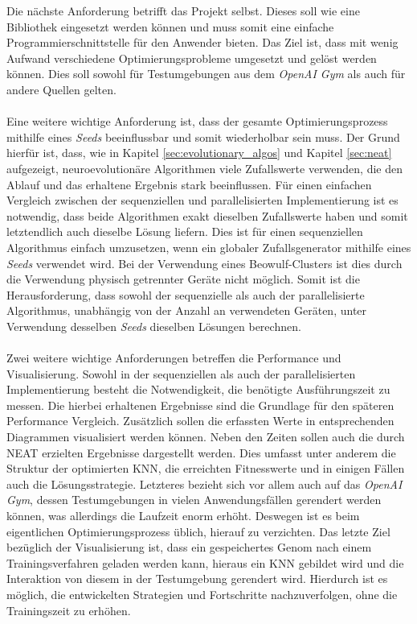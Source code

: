 Die nächste Anforderung betrifft das Projekt selbst. Dieses soll wie eine Bibliothek eingesetzt werden können und muss somit eine einfache Programmierschnittstelle für den Anwender bieten. Das Ziel ist, dass mit wenig Aufwand verschiedene Optimierungsprobleme umgesetzt und gelöst werden können. Dies soll sowohl für Testumgebungen aus dem \emph{OpenAI Gym} als auch für andere Quellen gelten. 
\\\\ %
Eine weitere wichtige Anforderung ist, dass der gesamte Optimierungsprozess mithilfe eines \emph{Seeds} beeinflussbar und somit wiederholbar sein muss. Der Grund hierfür ist, dass, wie in Kapitel \ref{sec:evolutionary_algos} und Kapitel \ref{sec:neat} aufgezeigt, neuroevolutionäre Algorithmen viele Zufallswerte verwenden, die den Ablauf und das erhaltene Ergebnis stark beeinflussen. Für einen einfachen Vergleich zwischen der sequenziellen und parallelisierten Implementierung ist es notwendig, dass beide Algorithmen exakt dieselben Zufallswerte haben und somit letztendlich auch dieselbe Lösung liefern. Dies ist für einen sequenziellen Algorithmus einfach umzusetzen, wenn ein globaler Zufallsgenerator mithilfe eines \emph{Seeds} verwendet wird. Bei der Verwendung eines Beowulf-Clusters ist dies durch die Verwendung physisch getrennter Geräte nicht möglich. Somit ist die Herausforderung, dass sowohl der sequenzielle als auch der parallelisierte Algorithmus, unabhängig von der Anzahl an verwendeten Geräten, unter Verwendung desselben \emph{Seeds} dieselben Lösungen berechnen.
\\\\
Zwei weitere wichtige Anforderungen betreffen die Performance und Visualisierung. Sowohl in der sequenziellen als auch der parallelisierten Implementierung besteht die Notwendigkeit, die benötigte Ausführungszeit zu messen. Die hierbei erhaltenen Ergebnisse sind die Grundlage für den späteren Performance Vergleich. Zusätzlich sollen die erfassten Werte in entsprechenden Diagrammen visualisiert werden können. Neben den Zeiten sollen auch die durch \ac{NEAT} erzielten Ergebnisse dargestellt werden. Dies umfasst unter anderem die Struktur der optimierten \ac{KNN}, die erreichten Fitnesswerte und in einigen Fällen auch die Lösungsstrategie. Letzteres bezieht sich vor allem auch auf das \emph{OpenAI Gym}, dessen Testumgebungen in vielen Anwendungsfällen gerendert werden können, was allerdings die Laufzeit enorm erhöht. Deswegen ist es beim eigentlichen Optimierungsprozess üblich, hierauf zu verzichten. Das letzte Ziel bezüglich der Visualisierung ist, dass ein gespeichertes Genom nach einem Trainingsverfahren geladen werden kann, hieraus ein \ac{KNN} gebildet wird und die Interaktion von diesem in der Testumgebung gerendert wird. Hierdurch ist es möglich, die entwickelten Strategien und Fortschritte nachzuverfolgen, ohne die Trainingszeit zu erhöhen.
